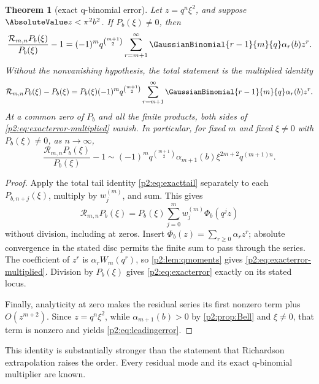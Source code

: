 \documentclass[11pt,oneside]{article}
\numberwithin{equation}{section}
\newtheorem{theorem}{Theorem}[section]
\theoremstyle{definition}
\theoremstyle{remark}
\begin{document}
\begin{theorem}[exact q-binomial error]
\label{p2:thm:exacterror}
Let \(z=q^n\xi^2\), and suppose \(\AbsoluteValue z<\pi^2b^2\).  If
\(P_b(\xi)\ne0\), then
\begin{equation}
 \frac{\mathcal R_{m,n}P_b(\xi)}{P_b(\xi)}-1
 =(-1)^m q^{\binom{m+1}{2}}
 \sum_{r=m+1}^{\infty}
 \GaussianBinomial{r-1}{m}{q}\alpha_r(b)z^r.
 \label{p2:eq:exacterror}
\end{equation}
Without the nonvanishing hypothesis, the total statement is the multiplied
identity
\begin{equation}
 \mathcal R_{m,n}P_b(\xi)-P_b(\xi)
 =P_b(\xi)(-1)^m q^{\binom{m+1}{2}}
 \sum_{r=m+1}^{\infty}
 \GaussianBinomial{r-1}{m}{q}\alpha_r(b)z^r.                         \label{p2:eq:exacterror-multiplied}
\end{equation}
At a common zero of \(P_b\) and all the finite products, both sides of
\eqref{p2:eq:exacterror-multiplied} vanish.  In particular, for fixed
\(m\) and fixed \(\xi\ne0\) with \(P_b(\xi)\ne0\), as \(n\to\infty\),
\begin{equation}
 \frac{\mathcal R_{m,n}P_b(\xi)}{P_b(\xi)}-1
 \sim (-1)^m q^{\binom{m+1}{2}}
 \alpha_{m+1}(b)\xi^{2m+2}q^{(m+1)n}.
 \label{p2:eq:leadingerror}
\end{equation}
\end{theorem}

\begin{proof}
Apply the total tail identity \eqref{p2:eq:exacttail} separately to each
\(P_{b,n+j}(\xi)\), multiply by \(w_j^{(m)}\), and sum.  This gives
\[
 \mathcal R_{m,n}P_b(\xi)
 =P_b(\xi)\sum_{j=0}^m w_j^{(m)}\Phi_b(q^jz)
\]
without division, including at zeros.  Insert
\(\Phi_b(z)=\sum_{r\geq0}\alpha_rz^r\); absolute convergence in the stated
disc permits the finite sum to pass through the series.  The coefficient of
\(z^r\) is \(\alpha_rW_m(q^r)\), so \cref{p2:lem:qmoments} gives
\eqref{p2:eq:exacterror-multiplied}.  Division by \(P_b(\xi)\) gives
\eqref{p2:eq:exacterror} exactly on its stated locus.

Finally, analyticity at zero makes the residual series its first nonzero term
plus \(O(z^{m+2})\).  Since \(z=q^n\xi^2\), while
\(\alpha_{m+1}(b)>0\) by \cref{p2:prop:Bell} and \(\xi\ne0\), that term is
nonzero and yields \eqref{p2:eq:leadingerror}.
\end{proof}

This identity is substantially stronger than the statement that Richardson
extrapolation raises the order. Every residual mode and its exact q-binomial
multiplier are known.
\end{document}

